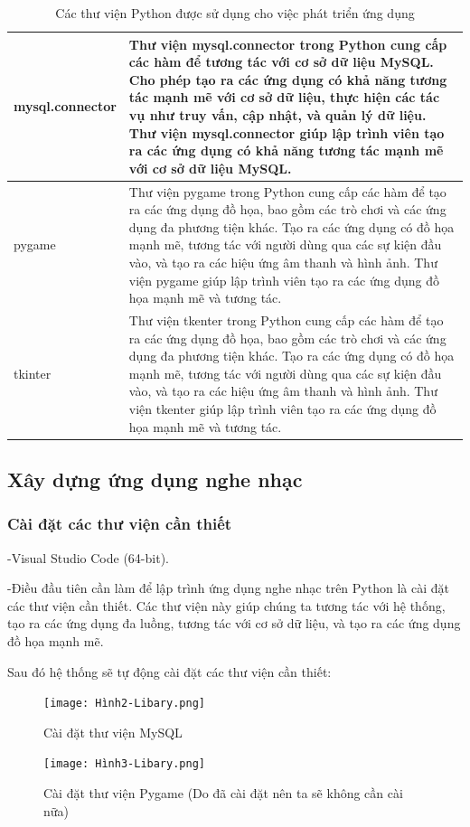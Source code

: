 \documentclass[a4paper]{article}
\begin{document}
\begin{table}[h]
\begin{tabular}{|l|p{10cm}|}
		\hline
		mysql.connector   & Thư viện mysql.connector trong Python cung cấp các hàm để tương tác với cơ sở dữ liệu MySQL. Cho phép tạo ra các ứng dụng có khả năng tương tác mạnh mẽ với cơ sở dữ liệu, thực hiện các tác vụ như truy vấn, cập nhật, và quản lý dữ liệu. Thư viện mysql.connector giúp lập trình viên tạo ra các ứng dụng có khả năng tương tác mạnh mẽ với cơ sở dữ liệu MySQL.                                                                                                       \\
		\hline
		pygame            & Thư viện pygame trong Python cung cấp các hàm để tạo ra các ứng dụng đồ họa, bao gồm các trò chơi và các ứng dụng đa phương tiện khác. Tạo ra các ứng dụng có đồ họa mạnh mẽ, tương tác với người dùng qua các sự kiện đầu vào, và tạo ra các hiệu ứng âm thanh và hình ảnh. Thư viện pygame giúp lập trình viên tạo ra các ứng dụng đồ họa mạnh mẽ và tương tác.                                                                                                         \\
		\hline
		tkinter           & Thư viện tkenter trong Python cung cấp các hàm để tạo ra các ứng dụng đồ họa, bao gồm các trò chơi và các ứng dụng đa phương tiện khác. Tạo ra các ứng dụng có đồ họa mạnh mẽ, tương tác với người dùng qua các sự kiện đầu vào, và tạo ra các hiệu ứng âm thanh và hình ảnh. Thư viện tkenter giúp lập trình viên tạo ra các ứng dụng đồ họa mạnh mẽ và tương tác.                                                                                                       \\
		\hline
	\end{tabular}
	\caption{Các thư viện Python được sử dụng cho việc phát triển ứng dụng}
	\label{tab:my_label}
\end{table}
\clearpage
\newpage
\subsection{Xây dựng ứng dụng nghe nhạc}
\subsubsection{Cài đặt các thư viện cần thiết}
\begin{flushleft}
	-Visual Studio Code (64-bit).

	-Điều đầu tiên cần làm để lập trình ứng dụng nghe nhạc trên Python là cài đặt các thư viện cần thiết.
	Các thư viện này giúp chúng ta tương tác với hệ thống, tạo ra các ứng dụng đa luồng,
	tương tác với cơ sở dữ liệu, và tạo ra các ứng dụng đồ họa mạnh mẽ.

	Sau đó hệ thống sẽ tự động cài đặt các thư viện cần thiết:
	\begin{figure}[h]
		\centering
		\texttt{[image: Hình2-Libary.png]}
		\caption{Cài đặt thư viện MySQL}
	\end{figure}
	\begin{figure}[h]
		\centering
		\texttt{[image: Hình3-Libary.png]}
		\caption{Cài đặt thư viện Pygame (Do đã cài đặt nên ta sẽ không cần cài nữa)}
	\end{figure}
\end{flushleft}
\end{document}
